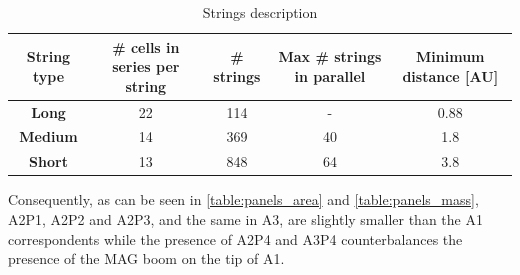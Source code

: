  \begin{table}[H]
    \renewcommand{\arraystretch}{1.3}
    \centering
\begin{tabular}{|c|c|c|c|c|}
    \hline
    \textbf{String type} & \textbf{\# cells in series per string} & \textbf{\# strings} & \textbf{Max \# strings in parallel} & \textbf{Minimum distance [AU]}\\
    \hline
    \hline
    \textbf{Long}    &  22 & 114 & - & 0.88 \\
    \hline
    \textbf{Medium}  &  14 & 369 & 40 & 1.8\\
    \hline
    \textbf{Short}   &  13 & 848 & 64 & 3.8 \\
    \hline
\end{tabular}
\caption{Strings description}
\label{table:strings_description}
\end{table}

\vspace{-3mm}

Consequently, as can be seen in \autoref{table:panels_area} and \autoref{table:panels_mass}, A2P1, A2P2 and A2P3, and the same in A3, are slightly smaller than the A1 correspondents while the presence of A2P4 and A3P4 counterbalances the presence of the MAG boom on the tip of A1. 

\vspace{3mm}

